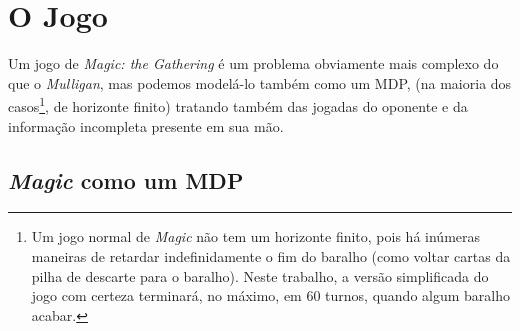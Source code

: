 \documentclass[dvipsnames]{book}
\begin{document}
\section{O Jogo}

Um jogo de \textit{Magic: the Gathering} é um problema obviamente mais complexo do que o \textit{Mulligan}, mas podemos modelá-lo também como um MDP,
(na maioria dos casos\footnote{Um jogo normal de \textit{Magic} não tem um horizonte finito, pois há
inúmeras maneiras de retardar indefinidamente o fim do baralho (como voltar cartas da pilha de descarte para o baralho). Neste trabalho, a versão
simplificada do jogo com certeza terminará, no máximo, em 60 turnos, quando algum baralho acabar.}, de horizonte finito) tratando também das jogadas do oponente e da informação incompleta presente em sua mão.

\subsection{\textit{Magic} como um MDP}
\end{document}
